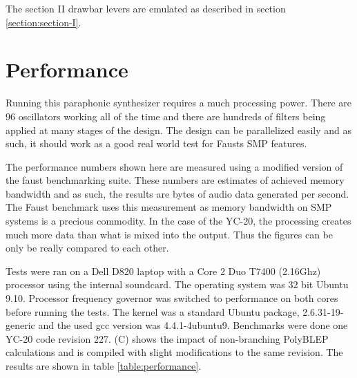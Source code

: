 \documentclass[11pt,a4paper]{article}
\begin{document}
The section II drawbar levers are emulated as described in section \ref{section:section-I}.

\section{Performance}
\label{section:performance}

Running this paraphonic synthesizer requires a much processing power. There are 96 oscillators working all of the time and there are hundreds of filters being applied at many stages of the design. The design can be parallelized easily and as such, it should work as a good real world test for Fausts SMP features.

The performance numbers shown here are measured using a modified version of the faust benchmarking suite. These numbers are estimates of achieved memory bandwidth and as such, the results are bytes of audio data generated per second. The Faust benchmark uses this measurement as memory bandwidth on SMP systems is a precious commodity. In the case of the YC-20, the processing creates much more data than what is mixed into the output. Thus the figures can be only be really compared to each other.

Tests were ran on a Dell D820 laptop with a Core 2 Duo T7400 (2.16Ghz) processor using the internal soundcard. The operating system was 32 bit Ubuntu 9.10. Processor frequency governor was switched to performance on both cores before running the tests. The kernel was a standard Ubuntu package, 2.6.31-19-generic and the used gcc version was 4.4.1-4ubuntu9. Benchmarks were done one YC-20 code revision 227. (C) shows the impact of non-branching PolyBLEP calculations and is compiled with slight modifications to the same revision. The results are shown in table \ref{table:performance}.
\end{document}
